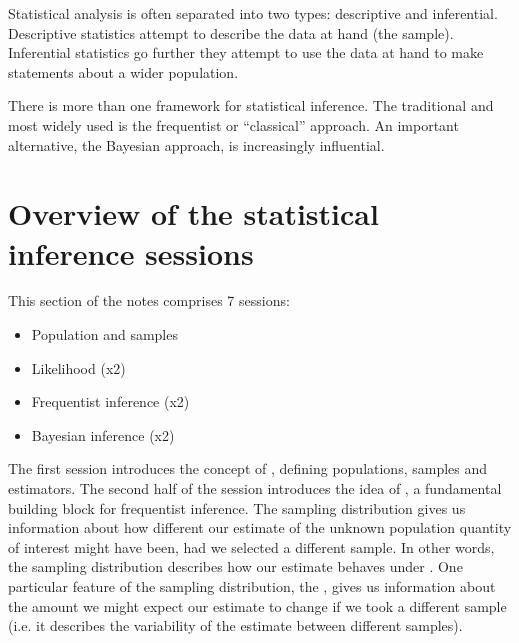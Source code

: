 \documentclass[letterpaper,10pt,english]{jupyterBook}
\begin{document}
\sphinxAtStartPar
Statistical analysis is often separated into two types: descriptive and inferential. Descriptive statistics attempt to describe the data at hand (the sample). Inferential statistics go further \sphinxhyphen{} they attempt to use the data at hand to make statements about a wider population.

\sphinxAtStartPar
There is more than one framework for statistical inference. The traditional and most widely used is the frequentist or “classical” approach. An important alternative, the Bayesian approach, is increasingly influential.


\section{Overview of the statistical inference sessions}
\label{\detokenize{04. Inference.Intro:overview-of-the-statistical-inference-sessions}}
\sphinxAtStartPar
This section of the notes comprises 7 sessions:
\begin{itemize}
\item {} 
\sphinxAtStartPar
Population and samples

\item {} 
\sphinxAtStartPar
Likelihood (x2)

\item {} 
\sphinxAtStartPar
Frequentist inference (x2)

\item {} 
\sphinxAtStartPar
Bayesian inference (x2)

\end{itemize}

\sphinxAtStartPar
The first session introduces the concept of , defining populations, samples and estimators. The second half of the session introduces the idea of , a fundamental building block for frequentist inference. The sampling distribution gives us information about how different our estimate of the unknown population quantity of interest might have been, had we selected a different sample. In other words, the sampling distribution describes how our estimate behaves under . One particular feature of the sampling distribution, the , gives us information about the amount we might expect our estimate to change if we took a different sample (i.e. it describes the variability of the estimate between different samples).
\end{document}

